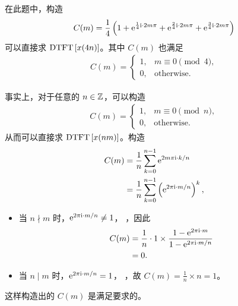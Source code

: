 \begin{remark}
    在此题中，构造
    \begin{align*}
        C(m) = \frac{1}{4}\left(1 + \mathrm{e}^{\frac{1}{4}\mathrm{i} \cdot 2m\pi}
            + \mathrm{e}^{\frac{2}{4}\mathrm{i} \cdot 2m\pi}
            + \mathrm{e}^{\frac{3}{4}\mathrm{i} \cdot 2m\pi}\right)
    \end{align*}
    可以直接求 $\mathrm{DTFT}\left[x(4n)\right]$。其中 $C(m)$ 也满足
    \begin{align*}
        C(m) = \begin{cases}
            1, & m \equiv 0 \pmod{4}, \\
            0, & \text{otherwise}.
        \end{cases}
    \end{align*}
\end{remark}

\begin{note}
    事实上，对于任意的 $n \in \mathbb{Z}$，可以构造
    \begin{align*}
        C(m) = \begin{cases}
            1, & m \equiv 0 \pmod{n}, \\
            0, & \text{otherwise}.
        \end{cases}
    \end{align*}
    从而可以直接求 $\mathrm{DTFT}\left[x(nm)\right]$。构造
    \begin{align*}
        C(m) & = \frac{1}{n}\sum_{k = 0}^{n-1}\mathrm{e}^{2m\pi\mathrm{i} \cdot k/n} \\
        & = \frac{1}{n}\sum_{k = 0}^{n - 1}\left(\mathrm{e}^{2\pi\mathrm{i} \cdot m/n}\right)^k,
    \end{align*}
    \begin{itemize}
        \item 当 $n \nmid m$ 时，$\mathrm{e}^{2\pi\mathrm{i} \cdot m/n} \neq 1$，
            ，因此
            \begin{align*}
                C(m) & = \frac{1}{n}\cdot 1 \times \frac{1 - \mathrm{e}^{2\pi\mathrm{i} \cdot m}}{1 - \mathrm{e}^{2\pi\mathrm{i} \cdot m/n}} \\
                & = 0.
            \end{align*}
        \item 当 $n \mid m$ 时，$\mathrm{e}^{2\pi\mathrm{i} \cdot m/n} = 1$，
            ，故 $C(m) = \frac{1}{n} \times n = 1$。
    \end{itemize}
    这样构造出的 $C(m)$ 是满足要求的。
\end{note}

